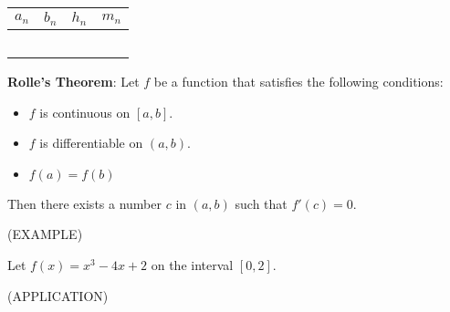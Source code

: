 \documentclass[11pt]{article}
\begin{document}
\begin{tabular}{|c| c| c| c|} \hline
$a_n$ & $b_n$ & $h_n$ & $m_n$\\ 
\hline
\hspace{1in} & \hspace{1in} & \hspace{1in} & \hspace{1in}\\ 
\hline
\hspace{1in} & \hspace{1in} & \hspace{1in} & \hspace{1in}\\ 
\hline
\hspace{1in} & \hspace{1in} & \hspace{1in} & \hspace{1in}\\ 
\hline
\hspace{1in} & \hspace{1in} & \hspace{1in} & \hspace{1in}\\ 
\hline
\hspace{1in} & \hspace{1in} & \hspace{1in} & \hspace{1in} \\
\hline
\end{tabular}



\pagebreak

{\bf Rolle's Theorem}:
Let $f$ be a function that satisfies the following conditions:

\begin{itemize}
\item{$f$ is continuous on $[a,b]$.}
\item{$f$ is differentiable on $(a,b)$.}
 \item{$f(a) = f(b)$}
  \end{itemize}

Then there exists a number $c$ in $(a,b)$ such that $f'(c)=0$.

\vspace{2.5in}

(EXAMPLE)

Let $f(x)=x^3-4x+2$ on the interval $[0,2]$.
\vspace{1in}


(APPLICATION)
\end{document}
